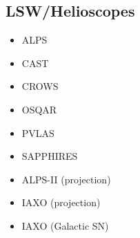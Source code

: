 \documentclass[8pt,twocolumn]{extarticle}
\begin{document}
\begin{mdframed}[everyline=true]
\subsection*{LSW/Helioscopes}\vspace{-0.5em}
\begin{itemize}\setlength\itemsep{-0.5em}
    \item ALPS~\cite{Ehret:2010mh}
    \item CAST~\cite{CAST:2007jps,CAST:2017uph}
    \item CROWS~\cite{Betz:2013dza}
    \item OSQAR~\cite{OSQAR:2015qdv}
    \item PVLAS~\cite{DellaValle:2015xxa}
    \item SAPPHIRES~\cite{SAPPHIRES:2021vkz,SAPPHIRES:2022bqg}
    \item ALPS-II (projection)~\cite{Ortiz:2020tgs}
    \item IAXO (projection)~\cite{IAXO:2019mpb}
    \item IAXO (Galactic SN)~\cite{Ge:2020zww}
\end{itemize}



\end{mdframed}
\end{document}
